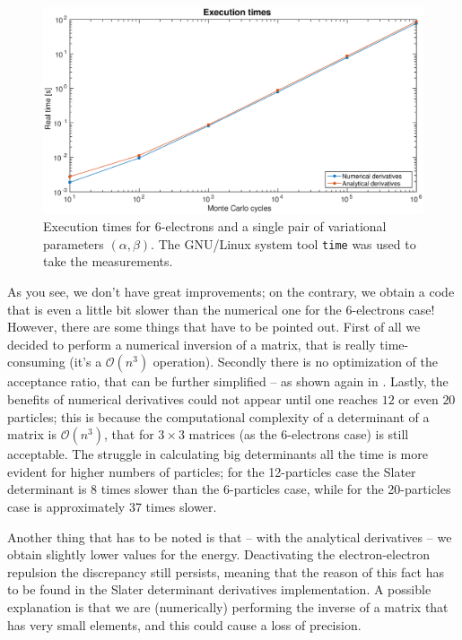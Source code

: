 \documentclass[a4paper,twoside,11pt]{book}
\begin{document}
\begin{figure}[H]
	\centering
	\includegraphics[width=\textwidth]{times_6e}
	\caption{Execution times for 6-electrons and a single pair of variational parameters $(\alpha,\beta)$. The GNU/Linux system tool \texttt{time} was used to take the measurements.}
	\label{fig:times_6e}
\end{figure}

As you see, we don't have great improvements; on the contrary, we obtain a code that is even a little bit slower than the numerical one for the 6-electrons case! However, there are some things that have to be pointed out. First of all we decided to perform a numerical inversion of a matrix, that is really time-consuming (it's a $\mathcal{O}(n^3)$ operation). Secondly there is no optimization of the acceptance ratio, that can be further simplified -- as shown again in \cite{jorgen}. Lastly, the benefits of numerical derivatives could not appear until one reaches $12$ or even $20$ particles; this is because the computational complexity of a determinant of a matrix is $\mathcal{O}(n^3)$, that for $3 \times 3$ matrices (as the 6-electrons case) is still acceptable. The struggle in calculating big determinants all the time is more evident for higher numbers of particles; for the 12-particles case the Slater determinant is 8 times slower than the 6-particles case, while for the 20-particles case is approximately 37 times slower.

Another thing that has to be noted is that -- with the analytical derivatives -- we obtain slightly lower values for the energy. Deactivating the electron-electron repulsion the discrepancy still persists, meaning that the reason of this fact has to be found in the Slater determinant derivatives implementation. A possible explanation is that we are (numerically) performing the inverse of a matrix that has very small elements, and this could cause a loss of precision.
\end{document}
